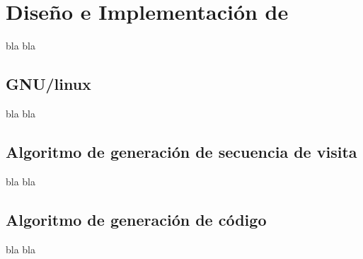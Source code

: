 \chapter{Diseño e Implementaci\'on de \maggen}
\label{chap:implem}
\minitoc


bla bla

\section{GNU/linux}

bla bla

\section{Algoritmo de generaci\'on de secuencia de visita}

bla bla
\section{Algoritmo de generaci\'on de c\'odigo}
bla bla
